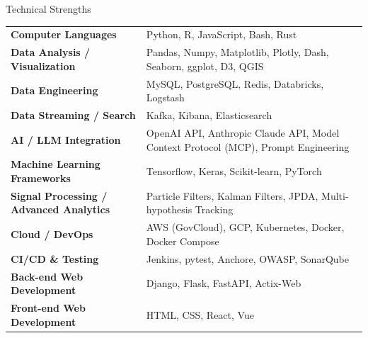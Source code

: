 \documentclass[
	11pt, %
]{resume} %
\begin{document}
\begin{rSection}{Technical Strengths}

	\begin{tabular}{@{} >{\bfseries}l @{\hspace{6ex}} p{} @{}}
		Computer Languages            & Python, R, JavaScript, Bash, Rust                                     \\
		Data Analysis / Visualization & Pandas, Numpy, Matplotlib, Plotly, Dash, Seaborn, ggplot, D3, QGIS          \\
		Data Engineering              & MySQL, PostgreSQL, Redis, Databricks, Logstash \\
		Data Streaming / Search       & Kafka, Kibana, Elasticsearch \\
		AI / LLM Integration          & OpenAI API, Anthropic Claude API, Model Context Protocol (MCP), Prompt Engineering \\
		Machine Learning Frameworks   & Tensorflow, Keras, Scikit-learn, PyTorch                                       \\
		Signal Processing / Advanced Analytics & Particle Filters, Kalman Filters, JPDA, Multi-hypothesis Tracking \\
		Cloud / DevOps                & AWS (GovCloud), GCP, Kubernetes, Docker, Docker Compose \\
		CI/CD \& Testing              & Jenkins, pytest, Anchore, OWASP, SonarQube \\
		Back-end Web Development      & Django, Flask, FastAPI, Actix-Web            \\
        Front-end Web Development     & HTML, CSS, React, Vue \\
	\end{tabular}
\end{rSection}





\end{document}
